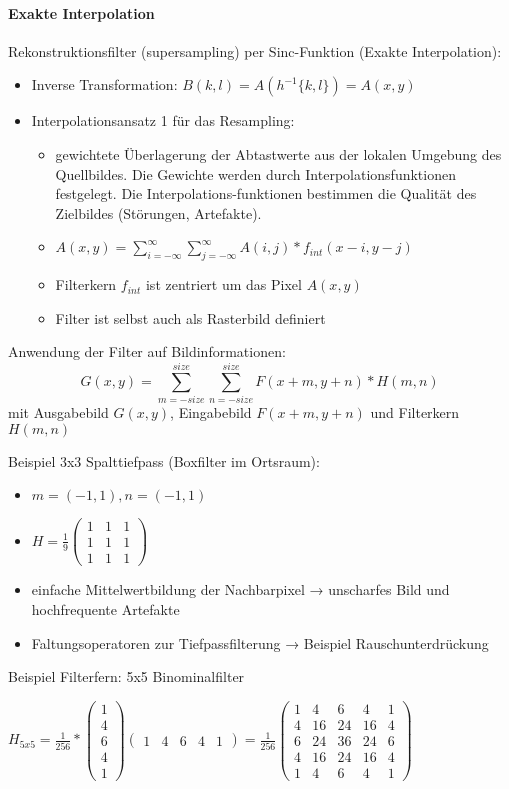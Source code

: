 \documentclass[10pt,landscape]{article}
\begin{document}
\begin{multicols}{3}
\paragraph{Exakte Interpolation}
Rekonstruktionsfilter (supersampling) per Sinc-Funktion (Exakte Interpolation):
\begin{itemize}
  \item Inverse Transformation: $B(k, l) = A(h^{-1} \{k, l\}) = A(x, y )$
  \item Interpolationsansatz 1 für das Resampling:
        \begin{itemize}
          \item gewichtete Überlagerung der Abtastwerte aus der lokalen Umgebung des Quellbildes. Die Gewichte werden durch Interpolationsfunktionen festgelegt. Die Interpolations-funktionen bestimmen die Qualität des Zielbildes (Störungen, Artefakte).
          \item $A(x,y)=\sum_{i=-\infty}^{\infty}\sum_{j=-\infty}^{\infty}A(i,j) * f_{int}(x-i, y-j)$
          \item Filterkern $f_{int}$ ist zentriert um das Pixel $A(x, y)$
          \item Filter ist selbst auch als Rasterbild definiert
        \end{itemize}
\end{itemize}

Anwendung der Filter auf Bildinformationen: 
$$G(x,y)=\sum_{m=-size}^{size} \sum_{n=-size}^{size} F(x+m, y+n) * H(m,n)$$
mit Ausgabebild $G(x,y)$, Eingabebild $F(x+m,y+n)$ und Filterkern $H(m,n)$

Beispiel 3x3 Spalttiefpass (Boxfilter im Ortsraum):
\begin{itemize}
  \item $m=(-1,1), n=(-1,1)$
  \item $H=\frac{1}{9} \begin{pmatrix} 1&1&1\\ 1&1&1 \\ 1&1&1 \end{pmatrix}$
  \item einfache Mittelwertbildung der Nachbarpixel → unscharfes Bild und hochfrequente Artefakte
  \item Faltungsoperatoren zur Tiefpassfilterung → Beispiel Rauschunterdrückung
\end{itemize}

Beispiel Filterfern: 5x5 Binominalfilter

$H_{5x5} =\frac{1}{256} * \begin{pmatrix} 1\\4\\6\\4\\1 \end{pmatrix} \begin{pmatrix} 1&4&6&4&1 \end{pmatrix}=\frac{1}{256} \begin{pmatrix} 1&4&6&4&1\\ 4&16&24&16&4\\ 6&24&36&24&6\\ 4&16&24&16&4\\ 1&4&6&4&1 \end{pmatrix}$


\end{multicols}
\end{document}
